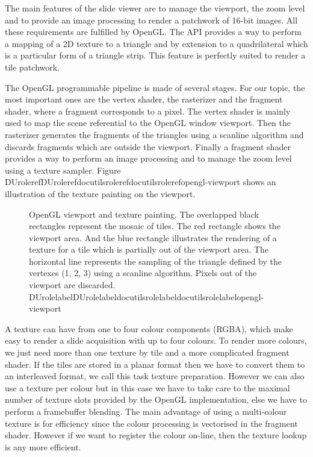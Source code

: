 \documentclass[letterpaper,compsoc,twoside]{IEEEtran}
\providecommand*{\DUrole}[2]{\ifcsname DUrole#1\endcsname \csname DUrole#1\endcsname{#2}\else \ifcsname docutilsrole#1\endcsname \csname docutilsrole#1\endcsname{#2}\else #2\fi \fi }
\begin{document}
The main features of the slide viewer are to manage the viewport, the zoom level and to provide an
image processing to render a patchwork of 16-bit images. All these requirements are fulfilled by
OpenGL. The API provides a way to perform a mapping of a 2D texture to a triangle and by extension
to a quadrilateral which is a particular form of a triangle strip. This feature is perfectly suited
to render a tile patchwork.

The OpenGL programmable pipeline is made of several stages. For our topic, the most important ones
are the vertex shader, the rasterizer and the fragment shader, where a fragment corresponds to a
pixel. The vertex shader is mainly used to map the scene referential to the OpenGL window
viewport. Then the rasterizer generates the fragments of the triangles using a scanline algorithm
and discards fragments which are outside the viewport. Finally a fragment shader provides a way to
perform an image processing and to manage the zoom level using a texture sampler. Figure
\DUrole{ref}{opengl-viewport} shows an illustration of the texture painting on the viewport.\begin{figure}[bht]\noindent{}
\caption{OpenGL viewport and texture painting. The overlapped black rectangles represent the mosaic of
tiles. The red rectangle shows the viewport area. And the blue rectangle illustrates the
rendering of a texture for a tile which is partially out of the viewport area. The horizontal
line represents the sampling of the triangle defined by the vertexes (1, 2, 3) using a scanline
algorithm. Pixels out of the viewport are discarded. \DUrole{label}{opengl-viewport}}
\end{figure}

A texture can have from one to four colour components (RGBA), which make easy to render a slide
acquisition with up to four colours. To render more colours, we just need more than one texture by
tile and a more complicated fragment shader. If the tiles are stored in a planar format then we have
to convert them to an interleaved format, we call this task texture preparation. However we can also
use a texture per colour but in this case we have to take care to the maximal number of texture
slots provided by the OpenGL implementation, else we have to perform a framebuffer blending. The
main advantage of using a multi-colour texture is for efficiency since the colour processing is
vectorised in the fragment shader. However if we want to register the colour on-line, then the
texture lookup is any more efficient.
\end{document}
